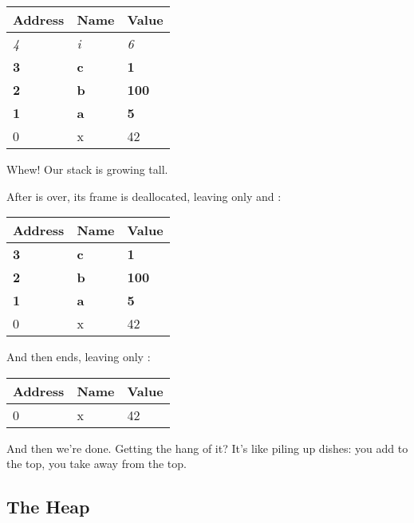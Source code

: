 \begin{table}[H]
  \begin{tabular}{|l|l|l|}
    \hline
    \textbf{Address} & \textbf{Name} & \textbf{Value} \\
    \hline
    \textit{4} & \textit{i} & \textit{6} \\
    \hline
    \textbf{3} & \textbf{c} & \textbf{1} \\
    \hline
    \textbf{2} & \textbf{b} & \textbf{100} \\
    \hline
    \textbf{1} & \textbf{a} & \textbf{5} \\
    \hline
    0 & x & 42 \\
    \hline
  \end{tabular}
\end{table}

Whew! Our stack is growing tall.

\blank

After  is over, its frame is deallocated, leaving only  and :

\begin{table}[H]
  \begin{tabular}{|l|l|l|}
    \hline
    \textbf{Address} & \textbf{Name} & \textbf{Value} \\
    \hline
    \textbf{3} & \textbf{c} & \textbf{1} \\
    \hline
    \textbf{2} & \textbf{b} & \textbf{100} \\
    \hline
    \textbf{1} & \textbf{a} & \textbf{5} \\
    \hline
    0 & x & 42 \\
    \hline
  \end{tabular}
\end{table}

And then  ends, leaving only :

\begin{table}[H]
  \begin{tabular}{|l|l|l|}
    \hline
    \textbf{Address} & \textbf{Name} & \textbf{Value} \\
    \hline
    0 & x & 42 \\
    \hline
  \end{tabular}
\end{table}

And then we're done. Getting the hang of it? It's like piling up dishes: you add to the top, you take away from the top.


\subsection*{The Heap}

